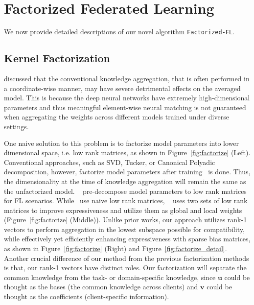 


\section{Factorized Federated Learning}
\label{sec:method}

We now provide detailed descriptions of our novel algorithm \texttt{Factorized-FL}. 

\subsection{Kernel Factorization}
\label{subsec:facto}

\citet{Wang2020Federated} discussed that the conventional knowledge aggregation, that is often performed in a coordinate-wise manner, may have severe detrimental effects on the averaged model. This is because the deep neural networks have extremely high-dimensional parameters and thus meaningful element-wise neural matching is not guaranteed when aggregating the weights across different models trained under diverse settings. 

One naive solution to this problem is to factorize model parameters into lower dimensional space, i.e. low rank matrices, as shown in Figure~\ref{fig:factorize} (Left). Conventional approaches, such as SVD, Tucker, or Canonical Polyadic decomposition, however, factorize model parameters after training~\citep{lebedev2014speeding,phan2020stable} is done. Thus, the dimensionality at the time of knowledge aggregation will remain the same as the unfactorized model. ~\citet{konevcny2016federated,anonymous2022fedpara} pre-decompose model parameters to low rank matrices for FL scenarios. While~\citet{konevcny2016federated} use naive low rank matrices, ~\citet{anonymous2022fedpara} uses two sets of low rank matrices to improve expressiveness and utilize them as global and local weights (Figure~\ref{fig:factorize} (Middle)). Unlike prior works, our approach utilizes rank-1 vectors to perform aggregation in the lowest subspace possible for compatibility, while effectively yet efficiently enhancing expressiveness with sparse bias matrices, as shown in Figure~\ref{fig:factorize} (Right) and Figure~\ref{fig:factorize_detail}. Another crucial difference of our method from the previous factorization methods is that, our rank-1 vectors have distinct roles. Our factorization will separate the common knowledge from the task- or domain-specific knowledge, since $\textbf{u}$ could be thought as the bases  (the common knowledge across clients) and $\textbf{v}$ could be thought as the coefficients (client-specific information). 

